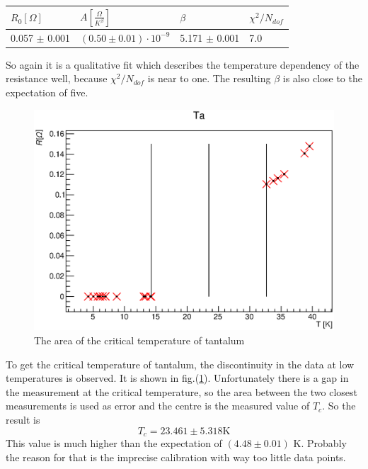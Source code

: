 \documentclass{article}
\begin{document}
\begin{table}[H]
    \centering
        \begin{tabular}{l|l|l|l}
        $R_0 [\Omega]$ & $ A[\si{\frac{\Omega}{K^\beta}}]$ & $\beta$ & $\chi^2/N_{dof}$\\\hline
        0.057 $\pm$ 0.001 & $(0.50 \pm 0.01)\cdot 10^{-9}$ & 5.171 $\pm$ 0.001 & 7.0 \\
        \end{tabular}
\end{table}
So again it is a qualitative fit which describes the temperature dependency of the resistance well, because $\chi^2/N_{dof}$ is near to one. The resulting $\beta$ is also close to the expectation of five.\\
\begin{figure}[H]
    \centering
    \includegraphics[width=\textwidth]{Graphen/Sprung.eps}
    \caption{The area of the critical temperature of tantalum}
    \label{jump}
\end{figure}
To get the critical temperature of tantalum, the discontinuity in the data at low temperatures is observed. It is shown in fig.(\ref{jump}). Unfortunately there is a gap in the measurement at the critical temperature, so the area between the two closest measurements is used as error and the centre is the measured value of $T_c$. So the result is 
\begin{equation*}
    T_c = 23.461  \pm 5.318 \mbox{K}
\end{equation*}
This value is much higher than the expectation of $(4.48 \pm 0.01)$ K. Probably the reason for that is the imprecise calibration with way too little data points. 
\end{document}
